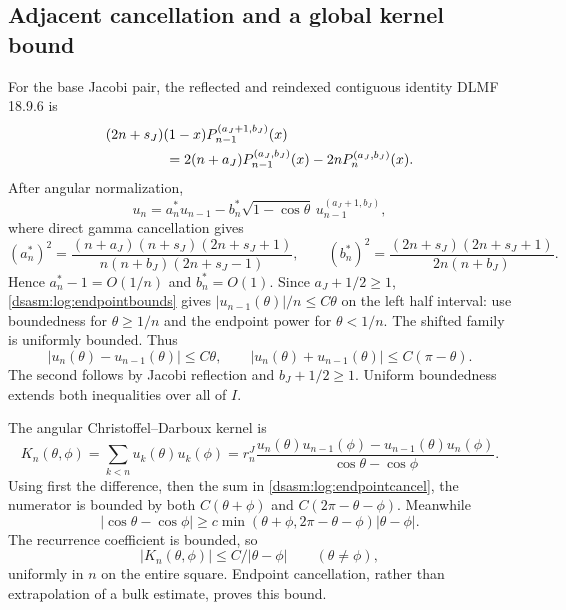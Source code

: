 \documentclass[11pt,letterpaper]{article}
\theoremstyle{remark}\newtheorem{remark}[theorem]{Remark}
\begin{document}
\subsection{Adjacent cancellation and a global kernel bound}
For the base Jacobi pair, the reflected and reindexed contiguous
identity DLMF 18.9.6 is
\begin{align*}
 &(2n+s_J)(1-x)P_{n-1}^{(a_J+1,b_J)}(x)\\
 &\hspace{15mm}=2(n+a_J)P_{n-1}^{(a_J,b_J)}(x)-2nP_n^{(a_J,b_J)}(x).
\end{align*}
After angular normalization,
\[
 u_n=a_n^*u_{n-1}-b_n^*\sqrt{1-\cos\theta}\,
                 u_{n-1}^{(a_J+1,b_J)},
\]
where direct gamma cancellation gives
\begin{equation}\label{dsasm:log:adjacentcoeff}
 (a_n^*)^2=\frac{(n+a_J)(n+s_J)(2n+s_J+1)}
                   {n(n+b_J)(2n+s_J-1)},\qquad
 (b_n^*)^2=\frac{(2n+s_J)(2n+s_J+1)}{2n(n+b_J)}.
\end{equation}
Hence $a_n^*-1=O(1/n)$ and $b_n^*=O(1)$. Since $a_J+1/2\ge1$,
\eqref{dsasm:log:endpointbounds} gives $|u_{n-1}(\theta)|/n\le C\theta$
on the left half interval: use boundedness for $\theta\ge1/n$
and the endpoint power for $\theta<1/n$. The shifted family is
uniformly bounded. Thus
\begin{equation}\label{dsasm:log:endpointcancel}
 |u_n(\theta)-u_{n-1}(\theta)|\le C\theta,\qquad
 |u_n(\theta)+u_{n-1}(\theta)|\le C(\pi-\theta).
\end{equation}
The second follows by Jacobi reflection and $b_J+1/2\ge1$.
Uniform boundedness extends both inequalities over all of $I$.

The angular Christoffel--Darboux kernel is
\[
 K_n(\theta,\phi)=\sum_{k<n}u_k(\theta)u_k(\phi)
 =r_n^J\frac{u_n(\theta)u_{n-1}(\phi)-u_{n-1}(\theta)u_n(\phi)}
                  {\cos\theta-\cos\phi}.
\]
Using first the difference, then the sum in \eqref{dsasm:log:endpointcancel},
the numerator is bounded by both $C(\theta+\phi)$ and
$C(2\pi-\theta-\phi)$. Meanwhile
\[
 |\cos\theta-\cos\phi|
 \ge c\min(\theta+\phi,2\pi-\theta-\phi)|\theta-\phi|.
\]
The recurrence coefficient is bounded, so
\begin{equation}\label{dsasm:log:kernelglobal}
 |K_n(\theta,\phi)|\le C/|\theta-\phi|\qquad(\theta\ne\phi),
\end{equation}
uniformly in $n$ on the entire square. Endpoint cancellation, rather
than extrapolation of a bulk estimate, proves this bound.
\end{document}
